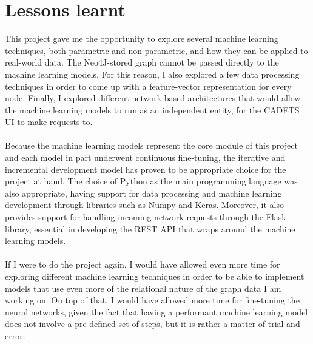 	\section{Lessons learnt} 
		This project gave me the opportunity to explore several machine learning techniques, both parametric and non-parametric, and how they can be applied to real-world data. The Neo4J-stored graph cannot be passed directly to the machine learning models. For this reason, I also explored a few data processing techniques in order to come up with a feature-vector representation for every node. Finally, I explored different network-based architectures that would allow the machine learning models to run as an independent entity, for the CADETS UI to make requests to.
		\\ \\
		Because the machine learning models represent the core module of this project and each model in part underwent continuous fine-tuning, the iterative and incremental development model has proven to be appropriate choice for the project at hand. The choice of Python as the main programming language was also appropriate, having support for data processing and machine learning development through libraries such as Numpy and Keras. Moreover, it also provides support for handling incoming network requests through the Flask library, essential in developing the REST API that wraps around the machine learning models.
		\\ \\
		If I were to do the project again, I would have allowed even more time for exploring different machine learning techniques in order to be able to implement models that use even more of the relational nature of the graph data I am working on. On top of that, I would have allowed more time for fine-tuning the neural networks, given the fact that having a performant machine learning model does not involve a pre-defined set of steps, but it is rather a matter of trial and error.
